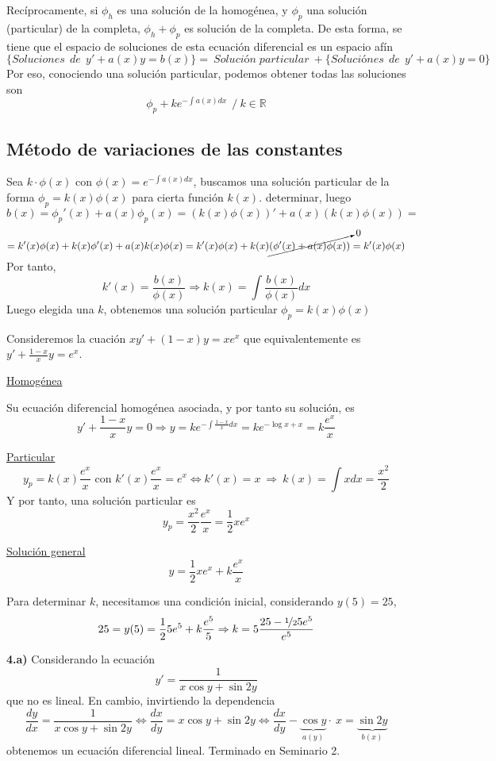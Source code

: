 Recíprocamente, si $\phi_h$ es una solución de la homogénea, y $\phi_p$ una solución (particular) de la completa, $\phi_h+\phi_p$ es solución de la completa. De esta forma, se tiene que el espacio de soluciones de esta ecuación diferencial es un espacio afín
$$\{Soluciones \: \: de \: \: y'+a(x)y=b(x)\}= \: Solución \; particular\: + \{Soluciónes \: \: de \: \: y'+a(x)y=0\}$$
Por eso, conociendo una solución particular, podemos obtener todas las soluciones son $$\phi_p+ke^{-\int a(x) dx} \: \: / \: k \in \mathbb R$$

\subsection{Método de variaciones de las constantes}
Sea $k \cdot \phi(x)$ con $\phi(x)=e^{-\int a(x)dx}$, buscamos una solución particular de la forma $\phi_p= k(x) \phi(x)$ para cierta función $k(x)$. determinar, luego
$$b(x)=\phi_p'(x)+a(x)\phi_p(x)=(k(x)\phi(x))'+a(x)(k(x)\phi(x))=$$$$=k'(x)\phi(x)+k(x)\phi'(x)+a(x)k(x)\phi(x)=k'(x)\phi(x)+k(x)\cancelto{0}{(\phi'(x)+a(x)\phi(x))}=k'(x)\phi(x)$$
Por tanto,
$$k'(x)=\dfrac{b(x)}{\phi(x)} \Rightarrow k(x)=\int \dfrac{b(x)}{\phi(x)}dx$$
Luego elegida una $k$, obtenemos una solución particular $\phi_p =k(x)\phi(x)$
\begin{ejer}
    Consideremos la cuación $xy'+(1-x)y=xe^x$ que equivalentemente es $y'+\frac{1-x}{x}y=e^x$.
    
   \underline{Homogénea} 
    
    Su ecuación diferencial homogénea asociada, y por tanto su solución, es
    $$y'+\dfrac{1-x}{x}y=0 \Rightarrow y =ke^{-\int \frac{1-x}{x}dx}=k e^{-\log x +x}=k\dfrac{e^x}{x}$$

    \underline{Particular}
    $$y_p=k(x)\dfrac{e^x}{x} \text{ con } k'(x) \dfrac{e^x}{x}=e^x \iff k'(x)=x \:\Rightarrow \: k(x)=\int x dx=\dfrac{x^2}{2}$$
    Y por tanto, una solución particular es
    $$y_p=\dfrac{x^2}{2} \dfrac{e^x}{x}=\dfrac{1}{2}xe^x$$

    \underline{Solución general}
    $$\boxed{y=\dfrac{1}{2}xe^x+k\dfrac{e^x}{x}}$$

    Para determinar $k$, necesitamos una condición inicial, considerando $y(5)=25$,
$$25=y(5)=\dfrac{1}{2}5e^5+k\dfrac{e^5}{5} \Rightarrow k=5\dfrac{25-\nicefrac{1}{2}5e^5}{e^5}$$
\end{ejer}
\begin{ejer}
    \textbf{4.a)} Considerando la ecuación 
    $$y'=\dfrac{1}{x\cos y+\sin 2y}$$
    que no es lineal. En cambio, invirtiendo la dependencia
    $$\dfrac{dy}{dx}=\dfrac{1}{x\cos y+\sin 2y} \iff \dfrac{dx}{dy}=x \cos y+\sin 2y \iff \dfrac{dx}{dy}-\underbrace{\cos y}_{a(y)} \cdot \: x=\underbrace{\sin 2y}_{b(x)}$$
    obtenemos un ecuación diferencial lineal. Terminado en Seminario 2.
\end{ejer}
